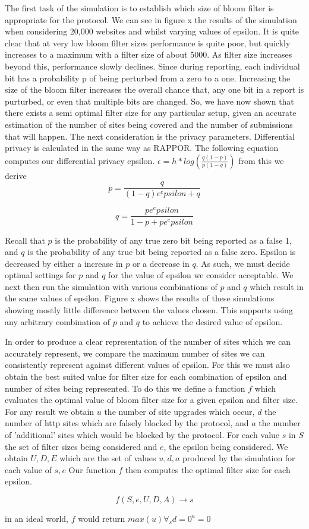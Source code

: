 \documentclass[11pt]{article}
\begin{document}
The first task of the simulation is to establish which size of bloom filter is appropriate for the protocol. We can see in figure x the results of the simulation when considering 20,000 websites and whilst varying values of epsilon. It is quite clear that at very low bloom filter sizes performance is quite poor, but quickly increases to a maximum with a filter size of about 5000. As filter size increases beyond this, performance slowly declines. Since during reporting, each individual bit has a probability p of being perturbed from a zero to a one. Increasing the size of the bloom filter increases the overall chance that, any one bit in a report is purturbed, or even that multiple bits are changed. So, we have now shown that there exists a semi optimal filter size for any particular setup, given an accurate estimation of the number of sites being covered and the number of submissions that will happen. The next consideration is the privacy parameters. Differential privacy is calculated in the same way as RAPPOR. The following equation computes our differential privacy epsilon. \(\epsilon = h * log(\frac{q(1-p)}{p(1-q)})\) from this we derive $$p = \frac{q}{(1-q)e^epsilon + q}$$

$$q = \frac{p e^epsilon}{1-p+pe^epsilon}$$

Recall that \(p\) is the probability of any true zero bit being reported as a false 1, and \(q\) is the probability of any true bit being reported as a false zero. Epsilon is decreased by either a increase in \(p\) or a decrease in \(q\). As such, we must decide optimal settings for \(p\) and \(q\) for the value of epsilon we consider acceptable. We next then run the simulation with various combinations of \(p\) and \(q\) which result in the same values of epsilon. Figure x shows the results of these simulations showing mostly little difference between the values chosen. This supports using any arbitrary combination of \(p\) and \(q\) to achieve the desired value of epsilon.

In order to produce a clear representation of the number of sites which we can accurately represent, we compare the maximum number of sites we can consistently represent against different values of epsilon. For this we must also obtain the best suited value for filter size for each combination of epsilon and number of sites being represented. To do this we define a function \(f\) which evaluates the optimal value of bloom filter size for a given epsilon and filter size. For any result we obtain \(u\) the number of site upgrades which occur, \(d\) the number of http sites which are falsely blocked by the protocol, and \(a\) the number of 'additional' sites which would be blocked by the protocol.
For each value \(s\) in \(S\) the set of filter sizes being considered and \(e\), the epsilon being considered. We obtain \(U,D,E\) which are the set of values \(u,d,a\) produced by the simulation for each value of \(s,e\)
Our function \(f\) then computes the optimal filter size for each epsilon.

$$f(S,e,U,D,A) \to s$$

in an ideal world, \(f\) would return \(max(u) \forall_s d=0 ^ a=0\)
\end{document}
